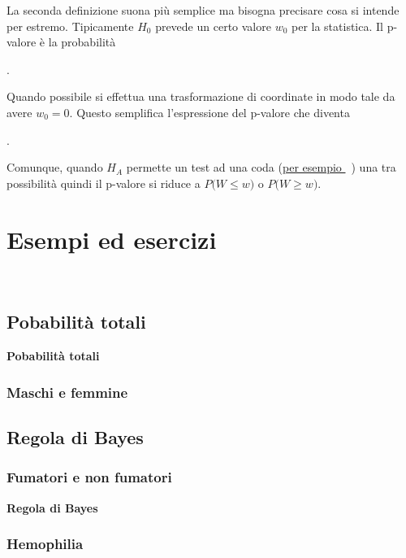 \documentclass[12pt,openany]{book}
\def\emph#1{\textcolor{blue}{\textbf{\boldmath #1}}}
\theoremstyle{mio}
\theoremstyle{liscio}
\begin{document}
La seconda definizione suona più semplice ma bisogna precisare cosa si intende per estremo. Tipicamente $H_0$ prevede un certo valore $w_0$ per la statistica. Il p-valore è la probabilità 

\ceq{\hfill \emph{p-valore}}{=}{P\big(|W-w_0|\ge |w-w_0|\big)}

. 

Quando possibile si effettua una trasformazione di coordinate in modo tale da avere $w_0=0$. Questo semplifica l'espressione del p-valore che diventa 

.

Comunque, quando $H_A$ permette un test ad una coda (\hyperref[Bernoulli_test]{per esempio \faShare}\ ) una tra possibilità quindi il p-valore si riduce a $P\big(W\le w\big)$ o $P\big(W\ge w\big)$.


\chapter{Esempi ed esercizi}
\label{ch2}

\ \ 




\clearpage\section{Pobabilità totali}
\label{MF_totali}



\clearpage\hfill\textbf{Pobabilità totali}
\subsection{Maschi e femmine}
\label{Fumatori_Bayes}


\clearpage\section{Regola di Bayes}
\label{Bayes}

\subsection{Fumatori e non fumatori}
\label{Fumatori_Bayes}


\clearpage\hfill\textbf{Regola di Bayes}\subsection{Hemophilia}
\label{Hemophilia}
\end{document}

